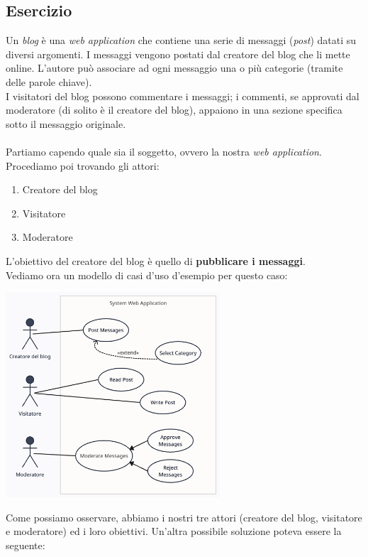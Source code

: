 \documentclass{article}
\begin{document}
\subsection*{Esercizio}
\large
Un \textit{blog} è una \textit{web application} che contiene una serie di messaggi (\textit{post}) datati su diversi argomenti. I messaggi vengono postati dal creatore del blog che li mette online. L'autore può associare ad ogni messaggio una o più categorie (tramite delle parole chiave). \\
I visitatori del blog possono commentare i messaggi; i commenti, se approvati dal moderatore (di solito è il creatore del blog), appaiono in una sezione specifica sotto il messaggio originale. \\ \\
Partiamo capendo quale sia il soggetto, ovvero la nostra \textit{web application}. Procediamo poi trovando gli attori:
\begin{enumerate}
    \renewcommand{\labelenumi}{-}
    \item Creatore del blog
    \item Visitatore
    \item Moderatore
\end{enumerate}
L'obiettivo del creatore del blog è quello di \textbf{pubblicare i messaggi}.\\
Vediamo ora un modello di casi d'uso d'esempio per questo caso:
\begin{center}
    \includegraphics[width=0.6\textwidth]{foto 9.png}
\end{center}
Come possiamo osservare, abbiamo i nostri tre attori (creatore del blog, visitatore e moderatore) ed i loro obiettivi.
Un'altra possibile soluzione poteva essere la seguente:
\end{document}
